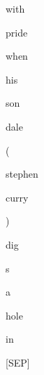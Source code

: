 \documentclass[varwidth=150mm]{standalone}
\begin{document}
\begin{CJK*}{UTF8}{gbsn}
{{{\colorbox{red!3.3520514965057373}{\strut with} \colorbox{red!7.893361568450928}{\strut pride} \colorbox{red!10.028459548950195}{\strut when} \colorbox{red!10.514643669128418}{\strut his} \colorbox{red!8.948071479797363}{\strut son} \colorbox{red!24.285722732543945}{\strut dale} \colorbox{red!5.912410736083984}{\strut (} \colorbox{red!7.422859191894531}{\strut stephen} \colorbox{red!8.205706596374512}{\strut curry} \colorbox{red!0.0}{\strut )} \colorbox{red!2.804797887802124}{\strut dig}\colorbox{red!4.243415832519531}{\strut s} \colorbox{red!5.763159275054932}{\strut a} \colorbox{red!7.670403957366943}{\strut hole} \colorbox{red!8.96934700012207}{\strut in} \colorbox{red!2.8333675861358643}{\strut [SEP]}
}}}
\end{CJK*}
\end{document}
